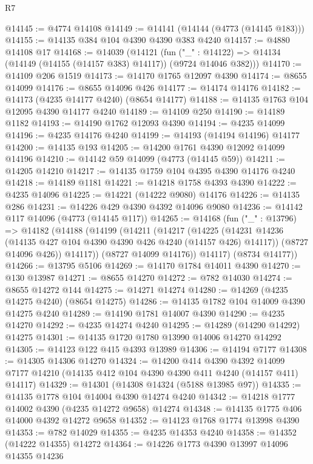 \begin{lexlean}{R7}
\begin{coremodule}
@14145 := @4774 @14108
@14149 := @14141 (@14144 (@4773 (@14145 @183)))
@14155 := @14135 @384 @104 @4390 @4390 @383 @4240
@14157 := @4880 @14108 @17
@14168 := @14039
    (@14121
      (fun ("_" : @14122) => @14134 (@14149 (@14155 (@14157 @383) @14117)) (@9724 @14046 @382)))
@14170 := @14109 @206 @1519
@14173 := @14170 @1765 @12097 @4390
@14174 := @8655 @14099
@14176 := @8655 @14096 @426
@14177 := @14174 @14176
@14182 := @14173 (@4235 @14177 @4240) (@8654 @14177)
@14188 := @14135 @1763 @104 @12095 @4390 @14177 @4240
@14189 := @14109 @250
@14190 := @14189 @1182
@14193 := @14190 @1762 @12093 @4390
@14194 := @4235 @14099
@14196 := @4235 @14176 @4240
@14199 := @14193 (@14194 @14196) @14177
@14200 := @14135 @193
@14205 := @14200 @1761 @4390 @12092 @14099 @14196
@14210 := @14142 @59 @14099 (@4773 (@14145 @59))
@14211 := @14205 @14210
@14217 := @14135 @1759 @104 @4395 @4390 @14176 @4240
@14218 := @14189 @1181
@14221 := @14218 @1758 @4393 @4390
@14222 := @4235 @14096
@14225 := @14221 (@14222 @9080) @14176
@14226 := @14135 @286
@14231 := @14226 @429 @4390 @4392 @14096 @9080
@14236 := @14142 @117 @14096 (@4773 (@14145 @117))
@14265 := @14168
    (fun ("_" : @13796) =>
    @14182
      (@14188
        (@14199
          (@14211
            (@14217
              (@14225
                (@14231 @14236 (@14135 @427 @104 @4390 @4390 @426 @4240 (@14157 @426) @14117))
                (@8727 @14096 @426))
              @14117))
          (@8727 @14099 @14176))
        @14117)
      (@8734 @14177))
@14266 := @13795 @5106
@14269 := @14170 @1784 @14011 @4390
@14270 := @130 @13987
@14271 := @8655 @14270
@14272 := @782 @14030
@14274 := @8655 @14272 @144
@14275 := @14271 @14274
@14280 := @14269 (@4235 @14275 @4240) (@8654 @14275)
@14286 := @14135 @1782 @104 @14009 @4390 @14275 @4240
@14289 := @14190 @1781 @14007 @4390
@14290 := @4235 @14270
@14292 := @4235 @14274 @4240
@14295 := @14289 (@14290 @14292) @14275
@14301 := @14135 @1720 @1780 @13990 @14006 @14270 @14292
@14305 := @14123 @122 @415 @4393 @13989
@14306 := @14194 @7177
@14308 := @14305 @14306 @14270
@14324 := @14200
    @414
    @4390
    @4392
    @14099
    @7177
    @14210
    (@14135 @412 @104 @4390 @4390 @411 @4240 (@14157 @411) @14117)
@14329 := @14301 (@14308 @14324 (@5188 @13985 @97))
@14335 := @14135 @1778 @104 @14004 @4390 @14274 @4240
@14342 := @14218 @1777 @14002 @4390 (@4235 @14272 @9658) @14274
@14348 := @14135 @1775 @406 @14000 @4392 @14272 @9658
@14352 := @14123 @1768 @1774 @13998 @4390
@14353 := @782 @14029
@14355 := @4235 @14353 @4240
@14358 := @14352 (@14222 @14355) @14272
@14364 := @14226 @1773 @4390 @13997 @14096 @14355 @14236

\end{coremodule}
\end{lexlean}
